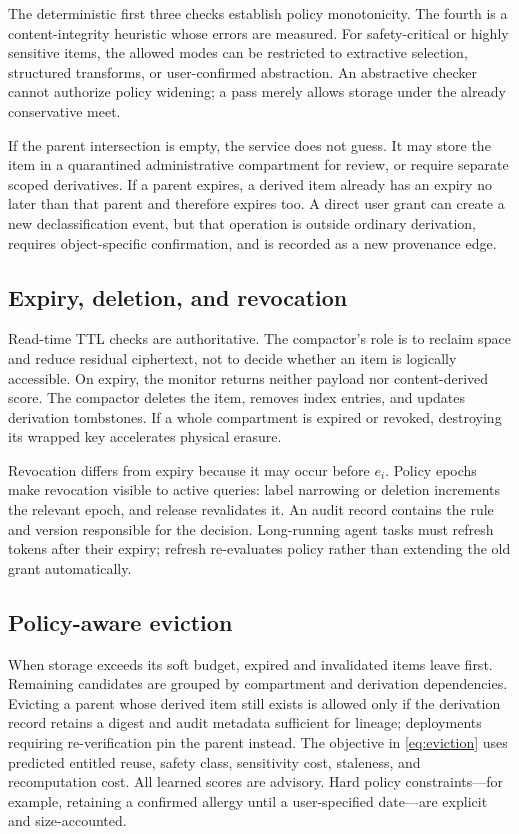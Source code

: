 The deterministic first three checks establish policy monotonicity. The fourth is a content-integrity heuristic whose errors are measured. For safety-critical or highly sensitive items, the allowed modes can be restricted to extractive selection, structured transforms, or user-confirmed abstraction. An abstractive checker cannot authorize policy widening; a pass merely allows storage under the already conservative meet.

If the parent intersection is empty, the service does not guess. It may store the item in a quarantined administrative compartment for review, or require separate scoped derivatives. If a parent expires, a derived item already has an expiry no later than that parent and therefore expires too. A direct user grant can create a new declassification event, but that operation is outside ordinary derivation, requires object-specific confirmation, and is recorded as a new provenance edge.

\subsection{Expiry, deletion, and revocation}

Read-time TTL checks are authoritative. The compactor's role is to reclaim space and reduce residual ciphertext, not to decide whether an item is logically accessible. On expiry, the monitor returns neither payload nor content-derived score. The compactor deletes the item, removes index entries, and updates derivation tombstones. If a whole compartment is expired or revoked, destroying its wrapped key accelerates physical erasure.

Revocation differs from expiry because it may occur before $e_i$. Policy epochs make revocation visible to active queries: label narrowing or deletion increments the relevant epoch, and release revalidates it. An audit record contains the rule and version responsible for the decision. Long-running agent tasks must refresh tokens after their expiry; refresh re-evaluates policy rather than extending the old grant automatically.

\subsection{Policy-aware eviction}

When storage exceeds its soft budget, expired and invalidated items leave first. Remaining candidates are grouped by compartment and derivation dependencies. Evicting a parent whose derived item still exists is allowed only if the derivation record retains a digest and audit metadata sufficient for lineage; deployments requiring re-verification pin the parent instead. The objective in \cref{eq:eviction} uses predicted entitled reuse, safety class, sensitivity cost, staleness, and recomputation cost. All learned scores are advisory. Hard policy constraints---for example, retaining a confirmed allergy until a user-specified date---are explicit and size-accounted.

